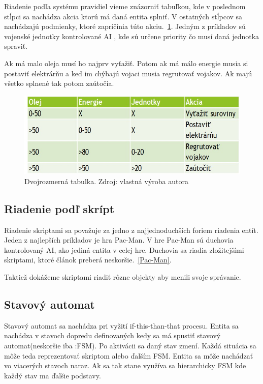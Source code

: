 \documentclass[10pt,oneside,slovak,a4paper]{article}
\begin{document}
Riadenie podľa systému pravidiel vieme znázorniť tabuľkou, kde v poslednom stĺpci sa nachádza akcia ktorú má daná entita splniť. V ostatných stĺpcov sa nachádzajú podmienky, ktoré zapríčinia túto akciu.~\ref{fig:rbs.1}. Jedným z príkladov sú vojenské jednotky kontrolované AI , kde sú určene priority čo musí daná jednotka spraviť.

Ak má malo oleja musí ho najprv vyťažiť. Potom ak má málo energie musia si postaviť elektrárňu a keď im chýbajú vojaci musia regrutovať vojakov. Ak majú všetko splnené tak potom zaútočia.



\begin{figure} [h!]
  \includegraphics[scale=0.7]{tabulka2.jpg}
  \caption{Dvojrozmerná tabulka. Zdroj: vlastná výroba autora}
  \label{fig:rbs.1}
\end{figure}



\subsection{Riadenie podľ skrípt} \label{skript}

Riadenie skriptami sa považuje za jedno z najjednoduchších foriem riadenia entít. Jeden z najlepších príkladov je hra Pac-Man. V hre Pac-Man sú duchovia kontrolovaný AI, ako jediná entita v celej hre. Duchovia sa riadia zložitejšími skriptami, ktoré článok preberá neskoršie.~\ref{Pac-Man}.

Taktiež dokážeme skriptami riadiť rôzne objekty aby menili svoje správanie. 


\subsection{Stavový automat} \label{FSM}

Stavový automat sa nachádza pri vyžití if-this-than-that procesu. Entita sa nachádza v stavoch dopredu definovaných kedy sa má spustiť stavový automat(neskoršie iba :FSM). Po aktivácii sa daný stav zmení. Každá situácia sa môže teda reprezentovať skriptom alebo ďalším FSM. Entita sa môže nachádzať vo  viacerých stavoch naraz. Ak sa tak stane využíva sa hierarchicky FSM kde každý stav ma ďalšie podstavy.
\end{document}
